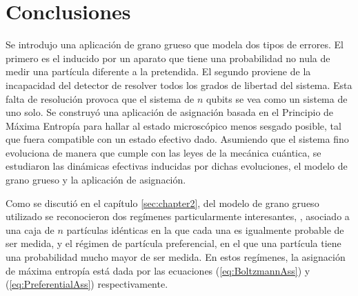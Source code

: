 \chapter{Conclusiones}




Se introdujo una aplicación de grano grueso que modela dos tipos de errores. El primero es el inducido por un aparato que tiene una probabilidad no nula de medir una partícula diferente a la pretendida. El segundo proviene de la incapacidad del detector de resolver todos los grados de libertad del sistema. Esta falta de resolución provoca que el sistema de $n$ qubits se vea como un sistema de uno solo. Se construyó una aplicación de asignación basada en el Principio de Máxima Entropía para hallar al estado microscópico menos sesgado posible, tal que fuera compatible con un estado efectivo dado. Asumiendo que el sistema fino evoluciona de manera que cumple con las leyes de la mecánica cuántica, se estudiaron las dinámicas efectivas inducidas por dichas evoluciones, el modelo de grano grueso y la aplicación de asignación.

Como se discutió en el capítulo \ref{sec:chapter2}, del modelo de grano grueso utilizado se reconocieron dos regímenes particularmente interesantes, , asociado a una caja de $n$ partículas idénticas en la que cada una es igualmente probable de ser medida, y el régimen de partícula preferencial, en el que una partícula tiene una probabilidad mucho mayor de ser medida. En estos regímenes, la asignación de máxima entropía está dada por las ecuaciones (\ref{eq:BoltzmannAss}) y (\ref{eq:PreferentialAss}) respectivamente.

